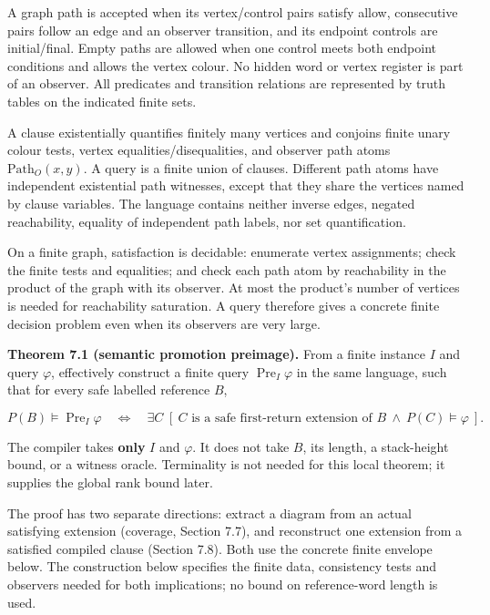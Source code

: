 \documentclass[
  11pt,
  a4paper,
]{article}
\begin{document}
A graph path is accepted when its vertex/control pairs satisfy allow,
consecutive pairs follow an edge and an observer transition, and its
endpoint controls are initial/final. Empty paths are allowed when one
control meets both endpoint conditions and allows the vertex colour. No
hidden word or vertex register is part of an observer. All predicates
and transition relations are represented by truth tables on the
indicated finite sets.

A clause existentially quantifies finitely many vertices and conjoins
finite unary colour tests, vertex equalities/disequalities, and observer
path atoms \(\mathrm{Path}_O(x,y)\). A query is a finite union of
clauses. Different path atoms have independent existential path
witnesses, except that they share the vertices named by clause
variables. The language contains neither inverse edges, negated
reachability, equality of independent path labels, nor set
quantification.

On a finite graph, satisfaction is decidable: enumerate vertex
assignments; check the finite tests and equalities; and check each path
atom by reachability in the product of the graph with its observer. At
most the product's number of vertices is needed for reachability
saturation. A query therefore gives a concrete finite decision problem
even when its observers are very large.


\textbf{Theorem 7.1 (semantic promotion preimage).} From a finite
instance \(I\) and query \(\varphi\), effectively construct a finite
query \(\operatorname{Pre}_I\varphi\) in the same language, such that
for every safe labelled reference \(B\),

\[P(B)\models\operatorname{Pre}_I\varphi
\quad\Longleftrightarrow\quad
\exists C\;[\ C\text{ is a safe first-return extension of }B
\ \land\ P(C)\models\varphi\ ].\tag{7.1}\]

The compiler takes \textbf{only} \(I\) and \(\varphi\). It does not take
\(B\), its length, a stack-height bound, or a witness oracle.
Terminality is not needed for this local theorem; it supplies the global
rank bound later.

The proof has two separate directions: extract a diagram from an actual
satisfying extension (coverage, Section 7.7), and reconstruct one
extension from a satisfied compiled clause (Section 7.8). Both use the
concrete finite envelope below. The construction below specifies the
finite data, consistency tests and observers needed for both
implications; no bound on reference-word length is used.
\end{document}
